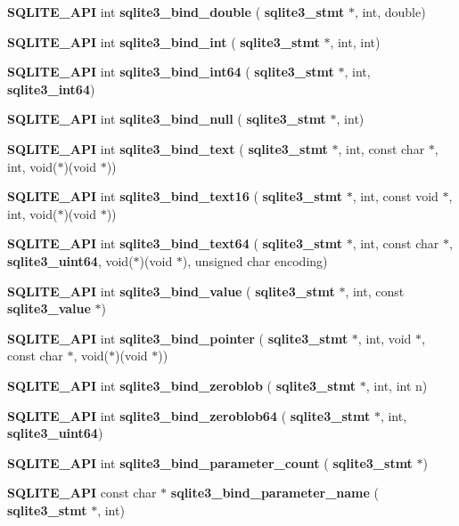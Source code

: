 \begin{DoxyCompactItemize}
\item 
\textbf{ S\+Q\+L\+I\+T\+E\+\_\+\+A\+PI} int \textbf{ sqlite3\+\_\+bind\+\_\+double} (\textbf{ sqlite3\+\_\+stmt} $\ast$, int, double)
\item 
\textbf{ S\+Q\+L\+I\+T\+E\+\_\+\+A\+PI} int \textbf{ sqlite3\+\_\+bind\+\_\+int} (\textbf{ sqlite3\+\_\+stmt} $\ast$, int, int)
\item 
\textbf{ S\+Q\+L\+I\+T\+E\+\_\+\+A\+PI} int \textbf{ sqlite3\+\_\+bind\+\_\+int64} (\textbf{ sqlite3\+\_\+stmt} $\ast$, int, \textbf{ sqlite3\+\_\+int64})
\item 
\textbf{ S\+Q\+L\+I\+T\+E\+\_\+\+A\+PI} int \textbf{ sqlite3\+\_\+bind\+\_\+null} (\textbf{ sqlite3\+\_\+stmt} $\ast$, int)
\item 
\textbf{ S\+Q\+L\+I\+T\+E\+\_\+\+A\+PI} int \textbf{ sqlite3\+\_\+bind\+\_\+text} (\textbf{ sqlite3\+\_\+stmt} $\ast$, int, const char $\ast$, int, void($\ast$)(void $\ast$))
\item 
\textbf{ S\+Q\+L\+I\+T\+E\+\_\+\+A\+PI} int \textbf{ sqlite3\+\_\+bind\+\_\+text16} (\textbf{ sqlite3\+\_\+stmt} $\ast$, int, const void $\ast$, int, void($\ast$)(void $\ast$))
\item 
\textbf{ S\+Q\+L\+I\+T\+E\+\_\+\+A\+PI} int \textbf{ sqlite3\+\_\+bind\+\_\+text64} (\textbf{ sqlite3\+\_\+stmt} $\ast$, int, const char $\ast$, \textbf{ sqlite3\+\_\+uint64}, void($\ast$)(void $\ast$), unsigned char encoding)
\item 
\textbf{ S\+Q\+L\+I\+T\+E\+\_\+\+A\+PI} int \textbf{ sqlite3\+\_\+bind\+\_\+value} (\textbf{ sqlite3\+\_\+stmt} $\ast$, int, const \textbf{ sqlite3\+\_\+value} $\ast$)
\item 
\textbf{ S\+Q\+L\+I\+T\+E\+\_\+\+A\+PI} int \textbf{ sqlite3\+\_\+bind\+\_\+pointer} (\textbf{ sqlite3\+\_\+stmt} $\ast$, int, void $\ast$, const char $\ast$, void($\ast$)(void $\ast$))
\item 
\textbf{ S\+Q\+L\+I\+T\+E\+\_\+\+A\+PI} int \textbf{ sqlite3\+\_\+bind\+\_\+zeroblob} (\textbf{ sqlite3\+\_\+stmt} $\ast$, int, int n)
\item 
\textbf{ S\+Q\+L\+I\+T\+E\+\_\+\+A\+PI} int \textbf{ sqlite3\+\_\+bind\+\_\+zeroblob64} (\textbf{ sqlite3\+\_\+stmt} $\ast$, int, \textbf{ sqlite3\+\_\+uint64})
\item 
\textbf{ S\+Q\+L\+I\+T\+E\+\_\+\+A\+PI} int \textbf{ sqlite3\+\_\+bind\+\_\+parameter\+\_\+count} (\textbf{ sqlite3\+\_\+stmt} $\ast$)
\item 
\textbf{ S\+Q\+L\+I\+T\+E\+\_\+\+A\+PI} const char $\ast$ \textbf{ sqlite3\+\_\+bind\+\_\+parameter\+\_\+name} (\textbf{ sqlite3\+\_\+stmt} $\ast$, int)

\end{DoxyCompactItemize}
